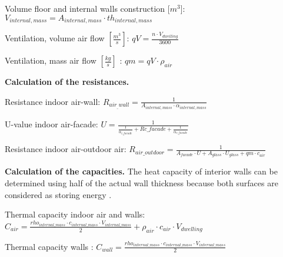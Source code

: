 \newpage
Volume floor and internal walls construction [$m^3$]: $V_{internal,mass} = A_{internal,mass} \cdot th_{internal,mass}$

Ventilation, volume air flow $[\frac{m^3}{s}]$: $qV = \frac{n \cdot V_{dwelling}}{3600} $  

Ventilation, mass air flow $[\frac{kg}{s}]$ : $qm = qV \cdot \rho_{air} $  
\newline

\textbf{Calculation of the resistances.}
\newline

Resistance indoor air-wall: $R_{air_{\_}wall} = \frac{1}{A_{internal,mass} \cdot \alpha_{internal,mass}} $ 

U-value indoor air-facade: $U =\frac{1}{\frac{1}{\alpha_{i{\_}facade}}   + R{c{\_}facade} + \frac{1}{\alpha_{e{\_}facade}}}$ 

Resistance indoor air-outdoor air: $R_{air{\_}outdoor} = \frac{1}{A_{facade} \cdot U + A_{glass} \cdot U_{glass} + qm \cdot c_{air}}$ 
\newline

\textbf{Calculation of the capacities.}
\newline
The heat capacity of interior walls can be determined using half of the actual wall thickness because both surfaces are considered as storing energy \cite{Architecture}.

Thermal capacity indoor air and walls: $C_{air} =\frac{rho_{internal{\_}mass} \cdot c_{internal{\_}mass} \cdot V_{internal{\_}mass}}{2} + \rho_{air} \cdot c_{air} \cdot V_{dwelling}  $ 

Thermal capacity walls : $C_{wall} =\frac{rho_{internal{\_}mass} \cdot c_{internal{\_}mass} \cdot V_{internal{\_}mass}}{2}$   

\newpage
  